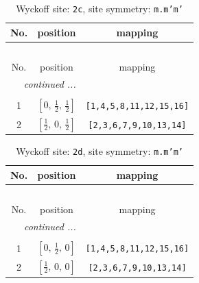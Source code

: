 \documentclass[fleqn,8pt]{jsarticle}
\begin{document}
\renewcommand{\arraystretch}{1.2}
\begin{longtable}{ccc}
\caption{Wyckoff site: {\tt 2c}, site symmetry: {\tt m.m'm'}}
 \\
 \hline \hline
No. & position & mapping \\ \hline \endfirsthead

\multicolumn{2}{l}{\tablename\ \thetable{}} \\
 \hline \hline
No. & position & mapping \\ \hline \endhead

 \hline \hline
\multicolumn{2}{r}{\footnotesize\it continued ...} \\ \endfoot

 \hline \hline
\multicolumn{2}{r}{} \\ \endlastfoot

1 & $\left[ 0,\, \frac{1}{2},\, \frac{1}{2} \right]$ & {\tt [1,4,5,8,11,12,15,16]} \\ \hline
2 & $\left[ \frac{1}{2},\, 0,\, \frac{1}{2} \right]$ & {\tt [2,3,6,7,9,10,13,14]} \\
\end{longtable}
\renewcommand{\arraystretch}{1.2}
\begin{longtable}{ccc}
\caption{Wyckoff site: {\tt 2d}, site symmetry: {\tt m.m'm'}}
 \\
 \hline \hline
No. & position & mapping \\ \hline \endfirsthead

\multicolumn{2}{l}{\tablename\ \thetable{}} \\
 \hline \hline
No. & position & mapping \\ \hline \endhead

 \hline \hline
\multicolumn{2}{r}{\footnotesize\it continued ...} \\ \endfoot

 \hline \hline
\multicolumn{2}{r}{} \\ \endlastfoot

1 & $\left[ 0,\, \frac{1}{2},\, 0 \right]$ & {\tt [1,4,5,8,11,12,15,16]} \\ \hline
2 & $\left[ \frac{1}{2},\, 0,\, 0 \right]$ & {\tt [2,3,6,7,9,10,13,14]} \\
\end{longtable}
\renewcommand{\arraystretch}{1.2}
\end{document}
